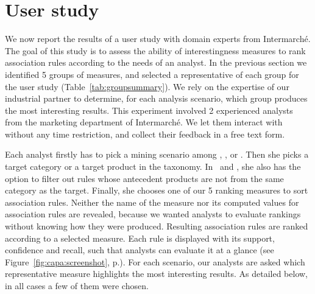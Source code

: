 









\vfill
\pagebreak


\section{User study}
\label{sec:xp:user}

We now report the results of a user study with domain experts from Intermarch\'e.
The goal of this study is to assess the ability of interestingness measures to rank association rules
according to the needs of an analyst.
In the previous section we identified 5 groups of measures,
and selected a representative of each group for the user study (Table~\ref{tab:groupsummary}).
We rely on the expertise of our industrial partner to determine, for each analysis scenario,
which group produces the most interesting results.
This experiment involved 2 experienced analysts from the marketing department of Intermarch\'e.
We let them interact with \capa without any time restriction,
and collect their feedback in a free text form.

Each analyst firstly has to pick a mining scenario among \demoassoc, \prodassocreceipt, or \prodassocclient.
Then she picks a target category or a target product in the taxonomy.
In \prodassocreceipt\ and \prodassocclient, she also has the option to
filter out rules whose antecedent products are not from the same category as the target.
Finally, she chooses one of our 5 ranking measures to sort association rules.
Neither the name of the measure nor its computed values for association rules are revealed,
because we wanted analysts to evaluate rankings without knowing how they were produced.
Resulting association rules are ranked according to a selected measure.
Each rule is displayed with its support, confidence and recall,
such that analysts can evaluate it at a glance
(see Figure~\ref{fig:capa:screenshot}, p.\pageref{fig:capa:screenshot}).
For each scenario,
our analysts are asked which representative measure highlights the most interesting results.
As detailed below, in all cases a few of them were chosen.

